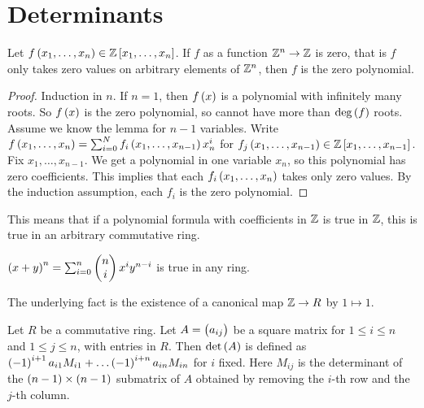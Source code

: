 \pagebreak

\section{Determinants}


\begin{lemma}
Let $ f\br{x_1, \dots, x_n} \in \Z\sbr{x_1, \dots, x_n} $. If $ f $ as a function $ \mathbb{Z}^n \to \mathbb{Z} $ is zero, that is $ f $ only takes zero values on arbitrary elements of $ \mathbb{Z}^n $, then $ f $ is the zero polynomial.
\end{lemma}

\begin{proof}
Induction in $ n $. If $ n = 1 $, then $ f\br{x} $ is a polynomial with infinitely many roots. So $ f\br{x} $ is the zero polynomial, so cannot have more than $ \deg\br{f} $ roots. Assume we know the lemma for $ n - 1 $ variables. Write $ f\br{x_1, \dots, x_n} = \sum_{i = 0}^N f_i\br{x_1, \dots, x_{n - 1}}x_n^i $ for $ f_j\br{x_1, \dots, x_{n - 1}} \in \Z\sbr{x_1, \dots, x_{n - 1}} $. Fix $ x_1, \dots, x_{n - 1} $. We get a polynomial in one variable $ x_n $, so this polynomial has zero coefficients. This implies that each $ f_i\br{x_1, \dots, x_n} $ takes only zero values. By the induction assumption, each $ f_i $ is the zero polynomial.
\end{proof}

\begin{remark}
\label{rem:7.2}
This means that if a polynomial formula with coefficients in $ \mathbb{Z} $ is true in $ \mathbb{Z} $, this is true in an arbitrary commutative ring.
\end{remark}

\begin{example*}
$ \br{x + y}^n = \sum_{i = 0}^n \twobyone{n}{i}x^iy^{n - i} $ is true in any ring.
\end{example*}

The underlying fact is the existence of a canonical map $ \mathbb{Z} \to R $ by $ 1 \mapsto 1 $.

\begin{definition}
Let $ R $ be a commutative ring. Let $ A = \br{a_{ij}} $ be a square matrix for $ 1 \le i \le n $ and $ 1 \le j \le n $, with entries in $ R $. Then $ \det\br{A} $ is defined as $ \br{-1}^{i + 1}a_{i1}M_{i1} + \dots \br{-1}^{i + n}a_{in}M_{in} $ for $ i $ fixed. Here $ M_{ij} $ is the determinant of the $ \br{n - 1} \times \br{n - 1} $ submatrix of $ A $ obtained by removing the $ i $-th row and the $ j $-th column.
\end{definition}

